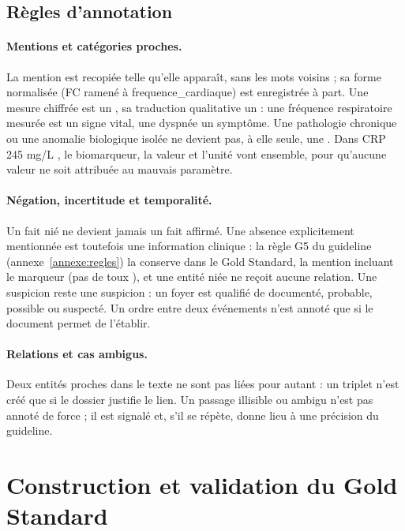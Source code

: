 \subsection{Règles d’annotation}\label{sec:c3-3-6}

\paragraph{Mentions et catégories proches.} La mention est recopiée telle qu’elle apparaît, sans les mots voisins ; sa forme normalisée (\og FC \fg{} ramené à frequence\_cardiaque) est enregistrée à part. Une mesure chiffrée est un , sa traduction qualitative un  : une fréquence respiratoire mesurée est un signe vital, une dyspnée un symptôme. Une pathologie chronique ou une anomalie biologique isolée ne devient pas, à elle seule, une . Dans \og CRP 245 mg/L \fg{}, le biomarqueur, la valeur et l’unité vont ensemble, pour qu’aucune valeur ne soit attribuée au mauvais paramètre.

\paragraph{Négation, incertitude et temporalité.}\label{sec:c3-3-6-4} Un fait nié ne devient jamais un fait affirmé. Une absence explicitement mentionnée est toutefois une information clinique : la règle G5 du guideline (annexe~\ref{annexe:regles}) la conserve dans le Gold Standard, la mention incluant le marqueur (\og pas de toux \fg{}), et une entité niée ne reçoit aucune relation. Une suspicion reste une suspicion : un foyer est qualifié de documenté, probable, possible ou suspecté. Un ordre entre deux événements n’est annoté que si le document permet de l’établir.

\paragraph{Relations et cas ambigus.} Deux entités proches dans le texte ne sont pas liées pour autant : un triplet n’est créé que si le dossier justifie le lien. Un passage illisible ou ambigu n’est pas annoté de force ; il est signalé et, s’il se répète, donne lieu à une précision du guideline.

\section{Construction et validation du Gold Standard}\label{sec:c3-3-7}

